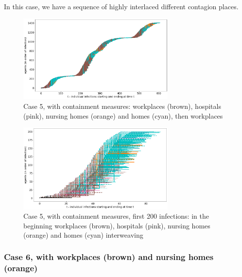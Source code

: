 \documentclass[11pt]{article}
\begin{document}
In this case, we have a sequence of highly interlaced different contagion places.

\begin{figure}[H]
\begin{center}
\includegraphics[width=0.7\textwidth]{with7a.png}%
\caption{Case 5, with containment measures: workplaces (brown), hospitals (pink), nursing homes (orange) and homes (cyan), then workplaces}
\label{7a}
\end{center}
\end{figure}

\begin{figure}[H]
\begin{center}
\includegraphics[width=0.7\textwidth]{with7b.png}%
\caption{Case 5, with containment measures, first 200 infections: in the beginning workplaces (brown), hospitals (pink), nursing homes (orange) and homes (cyan) interweaving}
\label{7b}
\end{center}
\end{figure}

\subsubsection{Case 6, with workplaces (brown) and nursing homes (orange)}
\label{c6}
\end{document}
